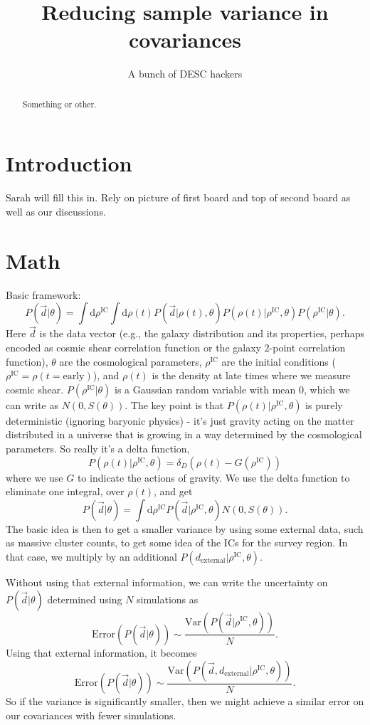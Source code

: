 \documentclass[preprint]{aastex}
\newcommand{\beq}{\begin{equation}}
\newcommand{\eeq}{\end{equation}}
\begin{document}
\title{Reducing sample variance in covariances}

\author{A bunch of DESC hackers}
\begin{abstract}
Something or other.
\end{abstract}

\section{Introduction}

Sarah will fill this in.  Rely on picture of first board and top of second board as well as our discussions.

\section{Math}

Basic framework:
\beq
P(\vec{d}|\theta) = \int \mathrm{d}\rho^\text{IC}\int \mathrm{d}\rho(t) P(\vec{d}|\rho(t),\theta)
P(\rho(t)|\rho^\text{IC},\theta) P(\rho^\text{IC}|\theta).
\eeq
Here $\vec{d}$ is the data vector (e.g., the galaxy distribution and its properties, perhaps encoded
as cosmic shear correlation function or the galaxy 2-point
correlation function), $\theta$ are the cosmological parameters, $\rho^\text{IC}$ are the initial
conditions ($\rho^\text{IC}=\rho(t=\text{early})$), and $\rho(t)$ is the density at late times where we measure cosmic
shear.  
$P(\rho^\text{IC}|\theta)$ is a Gaussian random variable with mean $0$, which we can write as $N(0,S(\theta))$.  The key point is that
$P(\rho(t)|\rho^\text{IC},\theta)$ is purely deterministic (ignoring baryonic physics) - it's just
gravity acting on the matter distributed in a universe that is growing in a way determined by the
cosmological parameters.  So really it's a delta function,
\beq
P(\rho(t)|\rho^\text{IC},\theta) = \delta_D(\rho(t)-G(\rho^\text{IC}))
\eeq 
where we use $G$ to indicate the actions of gravity.  We use the delta function to eliminate one
integral, over $\rho(t)$, and get
\beq
P(\vec{d}|\theta) = \int \mathrm{d}\rho^\text{IC}  P(\vec{d}|\rho^\text{IC},\theta)N(0,S(\theta)).
\eeq
The basic idea is then to get a smaller variance by using some external data, such as massive
cluster counts, to get some idea of the ICs for the survey region.  In that case, we multiply by an
additional $P(d_\text{external}|\rho^\text{IC},\theta)$.

Without using that external information, we can write the uncertainty on $P(\vec{d}|\theta)$
determined using $N$ simulations as
\beq
\text{Error}(P(\vec{d}|\theta)) \sim \frac{\text{Var}(P(\vec{d}|\rho^\text{IC},\theta))}{N}.
\eeq
Using that external information, it becomes
\beq
\text{Error}(P(\vec{d}|\theta)) \sim \frac{\text{Var}(P(\vec{d},d_\text{external}|\rho^\text{IC},\theta))}{N}.
\eeq
So if the variance is significantly smaller, then we might achieve a similar error on our
covariances with fewer simulations.
\end{document}
